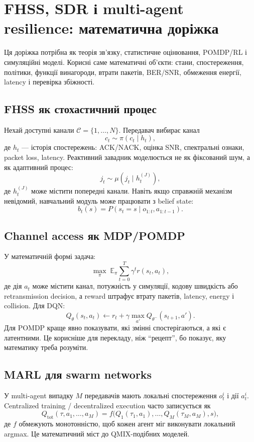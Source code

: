 \chapter{FHSS, SDR і multi-agent resilience: математична доріжка}

Ця доріжка потрібна як теорія зв'язку, статистичне оцінювання, POMDP/RL і симуляційні моделі. Корисні саме математичні об'єкти: стани, спостереження, політики, функції винагороди, втрати пакетів, BER/SNR, обмеження енергії, latency і перевірка збіжності.

\section*{FHSS як стохастичний процес}

Нехай доступні канали $\mathcal{C}=\{1,\ldots,N\}$. Передавач вибирає канал
\[
  c_t \sim \pi(c_t\mid h_t),
\]
де $h_t$ --- історія спостережень: ACK/NACK, оцінка SNR, спектральні ознаки, packet loss, latency. Реактивний завадник моделюється не як фіксований шум, а як адаптивний процес:
\[
  j_t \sim \mu(j_t\mid h_t^{(J)}),
\]
де $h_t^{(J)}$ може містити попередні канали. Навіть якщо справжній механізм невідомий, навчальний модуль може працювати з belief state:
\[
  b_t(s)=P(s_t=s\mid o_{1:t},a_{1:t-1}).
\]

\section*{Channel access як MDP/POMDP}

У математичній формі задача:
\[
  \max_\pi \; \mathbb{E}_\pi\sum_{t=0}^{T}\gamma^t r(s_t,a_t),
\]
де дія $a_t$ може містити канал, потужність у симуляції, кодову швидкість або retransmission decision, а reward штрафує втрату пакетів, latency, energy і collision. Для DQN:
\[
  Q_{\theta}(s_t,a_t) \leftarrow r_t+\gamma \max_{a'}Q_{\theta^-}(s_{t+1},a').
\]
Для POMDP краще явно показувати, які змінні спостерігаються, а які є латентними. Це корисніше для перекладу, ніж ``рецепт'', бо показує, яку математику треба розуміти.

\section*{MARL для swarm networks}

У multi-agent випадку $M$ передавачів мають локальні спостереження $o_t^i$ і дії $a_t^i$. Centralized training / decentralized execution часто записується як
\[
  Q_{\mathrm{tot}}(\tau, a_1,\ldots,a_M)
  = f\bigl(Q_1(\tau_1,a_1),\ldots,Q_M(\tau_M,a_M),s\bigr),
\]
де $f$ обмежують монотонністю, щоб кожен агент міг виконувати локальний argmax. Це математичний міст до QMIX-подібних моделей.

